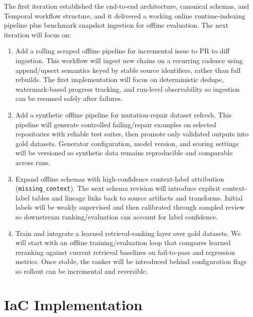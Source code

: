 \documentclass[a4paper,12pt]{article}
\begin{document}
The first iteration established the end-to-end architecture, canonical schemas, and Temporal workflow structure, and it delivered a working online runtime-indexing pipeline plus benchmark snapshot ingestion for offline evaluation. The next iteration will focus on:

\begin{enumerate}
    \item Add a rolling scraped offline pipeline for incremental issue to PR to diff ingestion. This workflow will ingest new chains on a recurring cadence using append/upsert semantics keyed by stable source identifiers, rather than full rebuilds. The first implementation will focus on deterministic dedupe, watermark-based progress tracking, and run-level observability so ingestion can be resumed safely after failures.
    \item Add a synthetic offline pipeline for mutation-repair dataset refresh. This pipeline will generate controlled failing/repair examples on selected repositories with reliable test suites, then promote only validated outputs into gold datasets. Generator configuration, model version, and scoring settings will be versioned so synthetic data remains reproducible and comparable across runs.
    \item Expand offline schemas with high-confidence context-label attribution (\texttt{missing\_context}). The next schema revision will introduce explicit context-label tables and lineage links back to source artifacts and transforms. Initial labels will be weakly supervised and then calibrated through sampled review so downstream ranking/evaluation can account for label confidence.
    \item Train and integrate a learned retrieval-ranking layer over gold datasets. We will start with an offline training/evaluation loop that compares learned reranking against current retrieval baselines on fail-to-pass and regression metrics. Once stable, the ranker will be introduced behind configuration flags so rollout can be incremental and reversible.
\end{enumerate}


%
%
%
%
%

\section{IaC Implementation}
\label{sec:iac}
\end{document}
